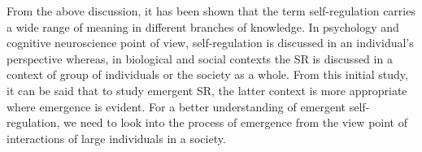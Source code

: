 From the above discussion, it has been shown that the term self-regulation carries a  wide range of meaning in different branches of knowledge. In psychology and cognitive neuroscience point of view, self-regulation is discussed in an individual's perspective whereas, in biological and social contexts the SR is discussed in a context of group of individuals or the society as a whole.  From this initial study, it can be said that  to study emergent SR,  the latter context is more appropriate where emergence is evident.  For a better understanding of emergent self-regulation, we need to look into the process of emergence from the view point of interactions of large individuals in a society.  

%


